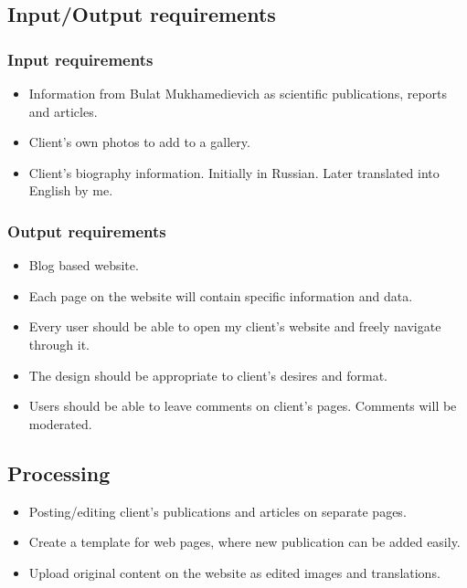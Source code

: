 \documentclass[a4paper, 12pt]{article}
\begin{document}
\subsection*{Input/Output requirements}

\subsubsection*{Input requirements}

\begin{itemize}
    \item Information from Bulat Mukhamedievich as scientific publications, reports and articles.
    \item Client's own photos to add to a gallery.
    \item Client's biography information. Initially in Russian. Later translated into English by me. 
\end{itemize}

\subsubsection*{Output requirements}

\begin{itemize}
    \item Blog based website.
    \item Each page on the website will contain specific information and data.
    \item Every user should be able to open my client’s website and freely navigate through it.
    \item The design should be appropriate to client’s desires and format.
    \item Users should be able to leave comments on client’s pages. Comments will be moderated.
\end{itemize}

\subsection*{Processing}

\begin{itemize}
    \item Posting/editing client’s publications and articles on separate pages.
    \item Create a template for web pages, where new publication can be added easily.
    \item Upload original content on the website as edited images and translations.
\end{itemize}
\end{document}
